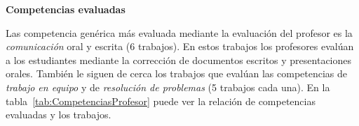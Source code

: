 
\bigskip
\textbf{Competencias evaluadas}
\bigskip

Las competencia genérica más evaluada mediante la evaluación del profesor es la \emph{comunicación} oral y escrita (6 trabajos). En estos trabajos los profesores evalúan a los estudiantes mediante la corrección de documentos escritos y presentaciones orales. También le siguen de cerca los trabajos que evalúan las competencias de \emph{trabajo en equipo} y de \emph{resolución de problemas} (5 trabajos cada una). En la tabla~\ref{tab:CompetenciasProfesor} puede ver la relación de competencias evaluadas y los trabajos.

